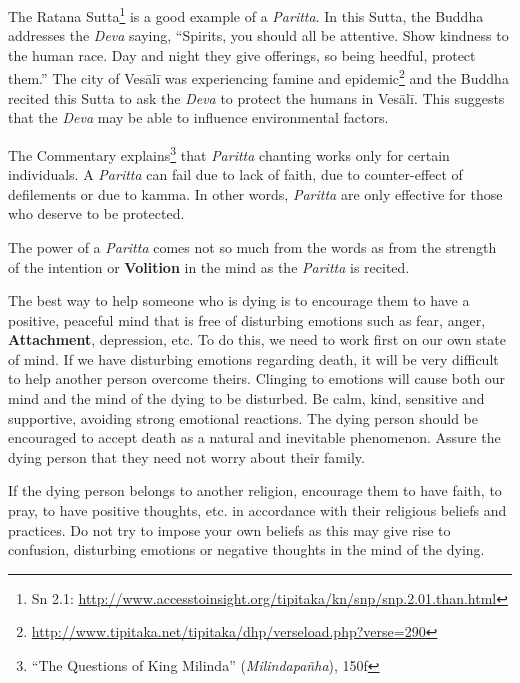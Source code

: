 
The Ratana Sutta\footnote{Sn 2.1: \url{http://www.accesstoinsight.org/tipitaka/kn/snp/snp.2.01.than.html}} is a good example of a \textit{Paritta}. In this Sutta, the Buddha addresses the \textit{Deva} saying, “Spirits, you should all be attentive. Show kindness to the human race. Day and night they give offerings, so being heedful, protect them.” The city of Vesālī was experiencing famine and epidemic\footnote{\url{http://www.tipitaka.net/tipitaka/dhp/verseload.php?verse=290}} and the Buddha recited this Sutta to ask the \textit{Deva} to protect the humans in Vesālī. This suggests that the \textit{Deva} may be able to influence environmental factors.

The Commentary explains\footnote{“The Questions of King Milinda” (\textit{Milindapañha}), 150f} that \textit{Paritta} chanting works only for certain individuals. A \textit{Paritta} can fail due to lack of faith, due to counter-effect of defilements or due to kamma. In other words, \textit{Paritta} are only effective for those who deserve to be protected.

The power of a \textit{Paritta} comes not so much from the words as from the strength of the intention or \textbf{Volition} in the mind as the \textit{Paritta} is recited.


The best way to help someone who is dying is to encourage them to have a positive, peaceful mind that is free of disturbing emotions such as fear, anger, \textbf{Attachment}, depression, etc. To do this, we need to work first on our own state of mind. If we have disturbing emotions regarding death, it will be very difficult to help another person overcome theirs. Clinging to emotions will cause both our mind and the mind of the dying to be disturbed. Be calm, kind, sensitive and supportive, avoiding strong emotional reactions. The dying person should be encouraged to accept death as a natural and inevitable phenomenon. Assure the dying person that they need not worry about their family.

If the dying person belongs to another religion, encourage them to have faith, to pray, to have positive thoughts, etc. in accordance with their religious beliefs and practices. Do not try to impose your own beliefs as this may give rise to confusion, disturbing emotions or negative thoughts in the mind of the dying.

